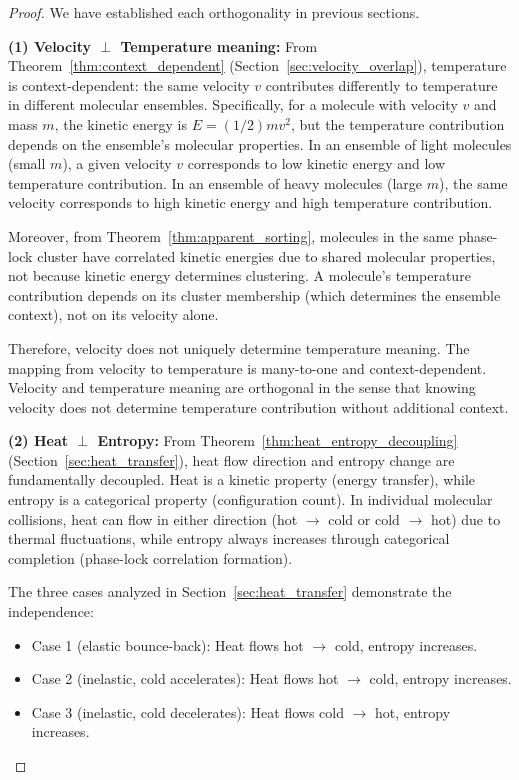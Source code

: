 \documentclass[12pt,a4paper]{article}
\theoremstyle{definition}
\theoremstyle{remark}
\begin{document}
\begin{proof}
We have established each orthogonality in previous sections.

\textbf{(1) Velocity $\perp$ Temperature meaning:}
From Theorem~\ref{thm:context_dependent} (Section~\ref{sec:velocity_overlap}), temperature is context-dependent: the same velocity $v$ contributes differently to temperature in different molecular ensembles. Specifically, for a molecule with velocity $v$ and mass $m$, the kinetic energy is $E = (1/2) m v^2$, but the temperature contribution depends on the ensemble's molecular properties. In an ensemble of light molecules (small $m$), a given velocity $v$ corresponds to low kinetic energy and low temperature contribution. In an ensemble of heavy molecules (large $m$), the same velocity corresponds to high kinetic energy and high temperature contribution.

Moreover, from Theorem~\ref{thm:apparent_sorting}, molecules in the same phase-lock cluster have correlated kinetic energies due to shared molecular properties, not because kinetic energy determines clustering. A molecule's temperature contribution depends on its cluster membership (which determines the ensemble context), not on its velocity alone.

Therefore, velocity does not uniquely determine temperature meaning. The mapping from velocity to temperature is many-to-one and context-dependent. Velocity and temperature meaning are orthogonal in the sense that knowing velocity does not determine temperature contribution without additional context.

\textbf{(2) Heat $\perp$ Entropy:}
From Theorem~\ref{thm:heat_entropy_decoupling} (Section~\ref{sec:heat_transfer}), heat flow direction and entropy change are fundamentally decoupled. Heat is a kinetic property (energy transfer), while entropy is a categorical property (configuration count). In individual molecular collisions, heat can flow in either direction (hot $\to$ cold or cold $\to$ hot) due to thermal fluctuations, while entropy always increases through categorical completion (phase-lock correlation formation).

The three cases analyzed in Section~\ref{sec:heat_transfer} demonstrate the independence:
\begin{itemize}
    \item Case 1 (elastic bounce-back): Heat flows hot $\to$ cold, entropy increases.
    \item Case 2 (inelastic, cold accelerates): Heat flows hot $\to$ cold, entropy increases.
    \item Case 3 (inelastic, cold decelerates): Heat flows cold $\to$ hot, entropy increases.
\end{itemize}


\end{proof}
\end{document}
